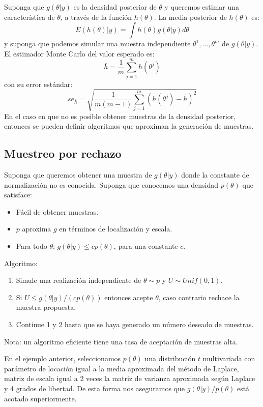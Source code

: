 \documentclass[
  12pt,
]{book}
\providecommand{\tightlist}{%
  \setlength{\itemsep}{0pt}\setlength{\parskip}{0pt}}
\theoremstyle{definition}
\theoremstyle{definition}
\theoremstyle{definition}
\theoremstyle{definition}
\theoremstyle{remark}
\begin{document}
Suponga que \(g(\theta|y)\) es la densidad posterior de \(\theta\) y queremos estimar una característica de \(\theta\), a través de la función \(h(\theta)\). La media posterior de \(h(\theta)\) es:
\[E(h(\theta)|y)=\int h(\theta)g(\theta|y)d\theta\]
y suponga que podemos simular una muestra independiente \(\theta^1,\ldots,\theta^m\) de \(g(\theta|y)\). El estimador Monte Carlo del valor esperado es:
\[\bar h =\frac 1 m\sum_{j=1}^mh(\theta^j) \]
con su error estándar:
\[se_{\bar h}=\sqrt{\frac{1}{m(m-1)}\sum_{j=1}^m\left(h(\theta^j)-\bar h\right)^2}\]
En el caso en que no es posible obtener muestras de la densidad posterior, entonces se pueden definir algoritmos que aproximan la generación de muestras.

\hypertarget{muestreo-por-rechazo}{%
\subsection{Muestreo por rechazo}\label{muestreo-por-rechazo}}

Suponga que queremos obtener una muestra de \(g(\theta|y)\) donde la constante de normalización no es conocida. Suponga que conocemos una densidad \(p(\theta)\) que satisface:

\begin{itemize}
\tightlist
\item
  Fácil de obtener muestras.
\item
  \(p\) aproxima \(g\) en términos de localización y escala.
\item
  Para todo \(\theta\): \(g(\theta|y)\leq cp(\theta)\), para una constante \(c\).
\end{itemize}

Algoritmo:

\begin{enumerate}
\def\labelenumi{\arabic{enumi}.}
\tightlist
\item
  Simule una realización independiente de \(\theta \sim p\) y \(U\sim Unif(0,1)\).
\item
  Si \(U\leq g(\theta|y)/(cp(\theta))\) entonces acepte \(\theta\), caso contrario rechace la muestra propuesta.
\item
  Continue 1 y 2 hasta que se haya generado un número deseado de muestras.
\end{enumerate}

Nota: un algoritmo eficiente tiene una tasa de aceptación de muestras alta.

En el ejemplo anterior, seleccionamos \(p(\theta)\) una distribución \(t\) multivariada con parámetro de locación igual a la media aproximada del método de Laplace, matriz de escala igual a 2 veces la matriz de varianza aproximada según Laplace y 4 grados de libertad. De esta forma nos aseguramos que \(g(\theta|y)/p(\theta)\) está acotado superiormente.
\end{document}
